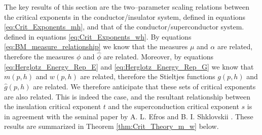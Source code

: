 \documentclass[english,12pt,jmp,graphicx]{revtex4-1}
\newcommand{\ph}{\hat{\phi}}
\begin{document}
The key results of this section are the two--parameter scaling
relations between the critical exponents in the conductor/insulator
system, defined in equations \eqref{eq:Crit_Exponents_mh},
and that of the conductor/superconductor system.
defined in equations \eqref{eq:Crit_Exponents_wh}.
By equations  \eqref{eq:BM_measure_relationship} we know that the
measures $\mu$ and $\alpha$ are related, therefore the measures $\phi$ and $\ph$
are related. Moreover, by equations \eqref{eq:Herglotz_Energy_Rep_E}
and \eqref{eq:Herglotz_Energy_Rep_G} we know that $m(p,h)$ and
$w(p,h)$ are related, therefore the Stieltjes functions $g(p,h)$ and
$\hat{g}(p,h)$ are related. We therefore anticipate that these sets of
critical exponents 
are also related. This is indeed the case, and the resultant
relationship between the insulation critical exponent $t$ and the
superconduction critical exponent $s$ is in agreement with the seminal
paper by A. L. Efros and B. I. Shklovskii \cite{Efros:PSSB-303}.
These results are summarized in Theorem \ref{thm:Crit_Theory_m_w}
below. 
%
%
%
\end{document}
